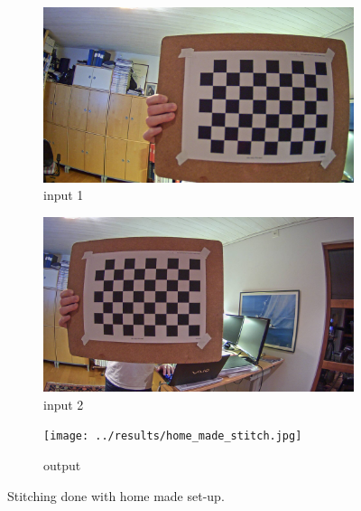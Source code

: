 \begin{figure}
	\centering
	\begin{subfigure}[t]{0.3\textwidth}
		\centering
		\includegraphics[width=\textwidth]{../data/homography/camera_1.jpg}
		\caption{input 1}
	\end{subfigure}
	\begin{subfigure}[t]{0.3\textwidth}
		\centering
		\includegraphics[width=\textwidth]{../data/homography/camera_2.jpg}
		\caption{input 2}
	\end{subfigure}
		\begin{subfigure}[t]{0.3\textwidth}
		\centering
                \texttt{[image: ../results/home\_made\_stitch.jpg]}
		\caption{output}
	\end{subfigure}
        \caption{Stitching done with home made set-up.}
	\label{fig:results:stitching:homemade}
\end{figure}
